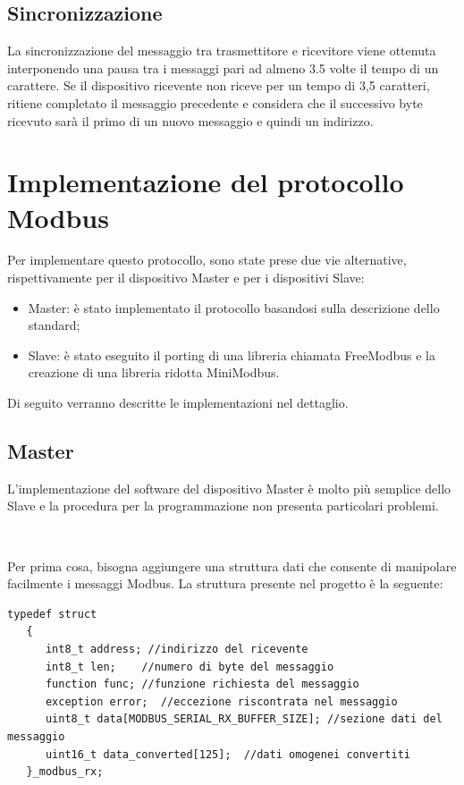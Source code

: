 \documentclass[a4paper,titlepage]{book}
\newcommand{\itema}{\begin{itemize}[noitemsep,topsep=10pt,parsep=23pt,partopsep=0pt]}
\begin{document}
\subsection{Sincronizzazione}
La sincronizzazione del messaggio tra trasmettitore e ricevitore viene ottenuta interponendo una pausa tra i messaggi pari ad almeno 3.5 volte il tempo di un carattere. Se il dispositivo ricevente non riceve per un tempo di 3,5 caratteri, ritiene completato il messaggio precedente e considera che il successivo byte ricevuto sarà il primo di un nuovo messaggio e quindi un indirizzo.


\section{Implementazione del protocollo Modbus}

Per implementare questo protocollo, sono state prese due vie alternative, rispettivamente per il dispositivo Master e per i dispositivi Slave:


\itema

\item Master: è stato implementato il protocollo basandosi sulla descrizione dello standard;
\item Slave: è stato eseguito il porting di una libreria chiamata FreeModbus e la creazione di una libreria ridotta MiniModbus.

\end{itemize}

Di seguito verranno descritte le implementazioni nel dettaglio.

\subsection{Master}

L'implementazione del software del dispositivo Master è molto più semplice dello Slave e la procedura per la programmazione non presenta particolari problemi.

~

Per prima cosa, bisogna aggiungere una struttura dati che consente di manipolare facilmente i messaggi Modbus. La struttura presente nel progetto è la seguente:

\begin{lstlisting}[showlines=false]
typedef struct
   {
      int8_t address; //indirizzo del ricevente
      int8_t len;    //numero di byte del messaggio
      function func; //funzione richiesta del messaggio
      exception error;  //eccezione riscontrata nel messaggio
      uint8_t data[MODBUS_SERIAL_RX_BUFFER_SIZE]; //sezione dati del messaggio
      uint16_t data_converted[125];  //dati omogenei convertiti
   }_modbus_rx;
\end{lstlisting}
\end{document}
